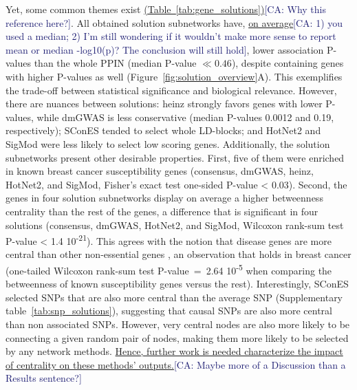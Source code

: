 \documentclass[twocolumn, 11pt]{article}
\newcommand{\cazcom}[2]{{\uline{#1}}\unskip\space\textcolor{MidnightBlue}{[CA: #2]}}
\begin{document}
Yet, some common themes exist \cazcom{(Table~\ref{tab:gene_solutions})}{Why this reference here?}. All obtained solution subnetworks have, \cazcom{on average}{1) you used a median; 2) I'm still wondering if it wouldn't make more sense to report mean or median -log10(p)? The conclusion will still hold}, lower association P-values than the whole PPIN (median P-value $\ll 0.46$), despite containing genes with higher P-values as well (Figure~\ref{fig:solution_overview}A). This exemplifies the trade-off between statistical significance and biological relevance. However, there are nuances between solutions: heinz strongly favors genes with lower P-values, while dmGWAS is less conservative (median P-values 0.0012 and 0.19, respectively); SConES tended to select whole LD-blocks; and HotNet2 and SigMod were less likely to select low scoring genes. Additionally, the solution subnetworks present other desirable properties. First, five of them were enriched in known breast cancer susceptibility genes (consensus, dmGWAS, heinz, HotNet2, and SigMod, Fisher's exact test one-sided P-value < 0.03). Second, the genes in four solution subnetworks display on average a higher betweenness centrality than the rest of the genes, a difference that is significant in four solutions (consensus, dmGWAS, HotNet2, and SigMod, Wilcoxon rank-sum test P-value < 1.4 \texttimes{} 10\textsuperscript{-21}). This agrees with the notion that disease genes are more central than other non-essential genes \cite{pinero_uncovering_2016}, an observation that holds in breast cancer (one-tailed Wilcoxon rank-sum test P-value~=~2.64 \texttimes{} 10\textsuperscript{-5} when comparing the betweenness of known susceptibility genes versus the rest). Interestingly, SConES selected SNPs that are also more central than the average SNP (Supplementary table~\ref{tab:snp_solutions}), suggesting that causal SNPs are also more central than non associated SNPs. However, very central nodes are also more likely to be connecting a given random pair of nodes, making them more likely to be selected by any network methods. \cazcom{Hence, further work is needed characterize the impact of centrality on these methods' outputs.}{Maybe more of a Discussion than a Results sentence?}
\end{document}
